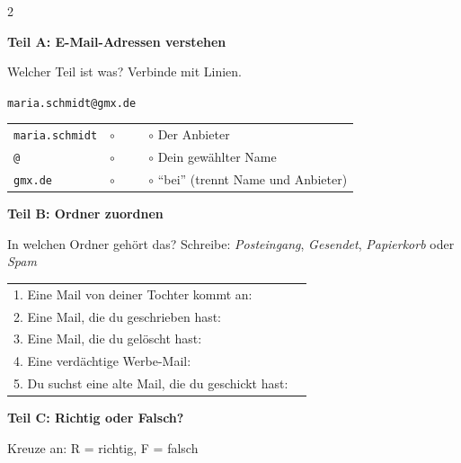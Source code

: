 \documentclass[a4paper,landscape,8pt]{extarticle}
\begin{document}
\begin{multicols}{2}

\textbf{\large Teil A: E-Mail-Adressen verstehen}

Welcher Teil ist was? Verbinde mit Linien.

\vspace{2mm}

\begin{center}
\texttt{maria.schmidt@gmx.de}
\end{center}

\vspace{2mm}

\renewcommand{\arraystretch}{1.8}
\begin{tabular}{@{}p{4cm}p{4cm}@{}}
\texttt{maria.schmidt} & $\circ$ ~~~~ $\circ$ Der Anbieter \\
\texttt{@} & $\circ$ ~~~~ $\circ$ Dein gewählter Name \\
\texttt{gmx.de} & $\circ$ ~~~~ $\circ$ ``bei'' (trennt Name und Anbieter) \\
\end{tabular}
\renewcommand{\arraystretch}{1}

\vspace{6mm}

\textbf{\large Teil B: Ordner zuordnen}

In welchen Ordner gehört das? Schreibe: \textit{Posteingang}, \textit{Gesendet}, \textit{Papierkorb} oder \textit{Spam}

\vspace{2mm}

\renewcommand{\arraystretch}{1.8}
\begin{tabular}{@{}p{8cm}p{4cm}@{}}
1. Eine Mail von deiner Tochter kommt an: & \dotfill \\
2. Eine Mail, die du geschrieben hast: & \dotfill \\
3. Eine Mail, die du gelöscht hast: & \dotfill \\
4. Eine verdächtige Werbe-Mail: & \dotfill \\
5. Du suchst eine alte Mail, die du geschickt hast: & \dotfill \\
\end{tabular}
\renewcommand{\arraystretch}{1}

\vspace{6mm}

\textbf{\large Teil C: Richtig oder Falsch?}

Kreuze an: R = richtig, F = falsch

\vspace{2mm}


\end{multicols}
\end{document}
